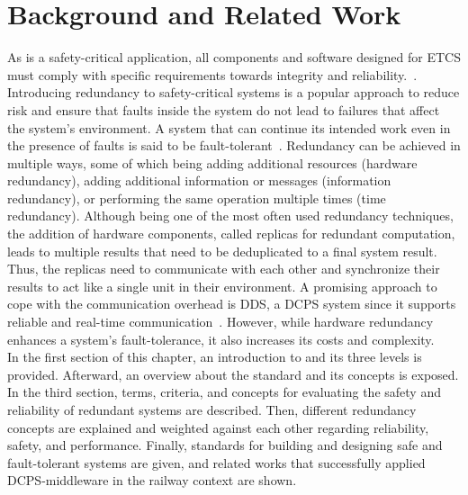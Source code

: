  \chapter{Background and Related Work}
\label{chptr:concepts}

As  is a safety-critical application, all components and software designed for {ETCS} must comply with specific requirements towards integrity and reliability.~\cite{OnBoardUnitSafetyTesting}. 
Introducing redundancy to safety-critical systems is a popular approach to reduce risk and ensure that faults inside the system do not lead to failures that affect the system's environment.
A system that can continue its intended work even in the presence of faults is said to be fault-tolerant~\cite{BarryFaultToleranceAnalysis}.
Redundancy can be achieved in multiple ways, some of which being adding additional resources (hardware redundancy), adding additional information or messages (information redundancy), or performing the same operation multiple times (time redundancy).
Although being one of the most often used redundancy techniques, the addition of hardware components, called replicas for redundant computation, leads to multiple results that need to be deduplicated to a final system result.
Thus, the replicas need to communicate with each other and synchronize their results to act like a single unit in their environment.
A promising approach to cope with the communication overhead is \gls*{DDS}, a \gls*{DCPS} system since it supports reliable and real-time communication~\cite{omgDDSspec}.
However, while hardware redundancy enhances a system's fault-tolerance, it also increases its costs and complexity.
\\

In the first section of this chapter, an introduction to  and its three levels is provided.
Afterward, an overview about the  standard and its concepts is exposed.
In the third section, terms, criteria, and concepts for evaluating the safety and reliability of redundant systems are described.
Then, different redundancy concepts are explained and weighted against each other regarding reliability, safety, and performance.
Finally, standards for building and designing safe and fault-tolerant systems are given, and related works that successfully applied \gls*{DCPS}-middleware in the railway context are shown.

